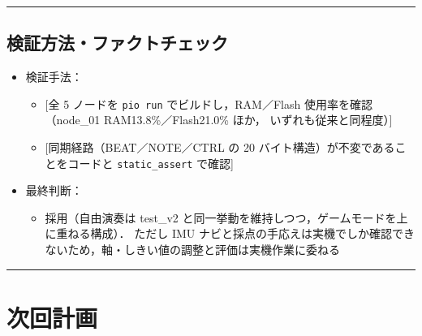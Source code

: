 \documentclass[uplatex,dvipdfmx,a4paper,11pt]{jsarticle}
\newcommand{\sectionrule}{\par\medskip\noindent\rule{\linewidth}{0.6pt}\par\medskip}
\begin{document}
\sectionrule

\subsection{検証方法・ファクトチェック}

\begin{itemize}
  \item 検証手法：
    \begin{itemize}
      \item {}[全 5 ノードを \texttt{pio run} でビルドし，RAM／Flash 使用率を確認（node\_01 RAM13.8\%／Flash21.0\% ほか，
            いずれも従来と同程度）]
      \item {}[同期経路（BEAT／NOTE／CTRL の 20 バイト構造）が不変であることをコードと \texttt{static\_assert} で確認]
    \end{itemize}
  \item 最終判断：
    \begin{itemize}
      \item 採用（自由演奏は test\_v2 と同一挙動を維持しつつ，ゲームモードを上に重ねる構成）．
            ただし IMU ナビと採点の手応えは実機でしか確認できないため，軸・しきい値の調整と評価は実機作業に委ねる
    \end{itemize}
\end{itemize}

\sectionrule

\section{次回計画}
\end{document}
